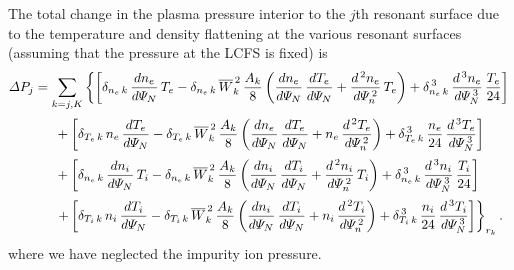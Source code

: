 \documentclass[notitlepage,12pt]{article}
\begin{document}
The total change in the plasma pressure interior to the $j$th resonant surface due to the temperature and
density flattening at the various resonant surfaces (assuming that the pressure at the LCFS is fixed) is
\begin{align}
{\mit\Delta}P_j &=\sum_{k=j,K} 
\left\{\left[\delta_{n_e\,k}\,\frac{dn_e}{d{\mit\Psi}_N}\,T_e- \delta_{n_e\,k}\,\overline{W}_k^{\,2}\,\frac{A_k}{8}\left(\frac{dn_e}{d{\mit\Psi}_N}\,\frac{dT_e}{d{\mit\Psi}_N}+\frac{d^{\,2}n_e}{d{\mit\Psi}_n^{\,2}}\,T_e\right)
+ \delta_{n_e\,k}^{\,3}\,\frac{d^{\,3}n_e}{d{\mit\Psi}_N^{\,3}}\,\frac{T_e}{24}\right]\right.
\nonumber\\[0.5ex]
&\phantom{++}+\left[\delta_{T_e\,k}\,n_e\,\frac{dT_e}{d{\mit\Psi}_N}- \delta_{T_e\,k}\,\overline{W}_k^{\,2}\,\frac{A_k}{8}\left(\frac{dn_e}{d{\mit\Psi}_N}\,\frac{dT_e}{d{\mit\Psi}_N}+
 n_e\,\frac{d^{\,2}T_e}{d{\mit\Psi}_n^{\,2}}\right)
+ \delta_{T_e\,k}^{\,3}\,\frac{n_e}{24}\,\frac{d^{\,3}T_e}{d{\mit\Psi}_N^{\,3}}\right]\nonumber\\[0.5ex]
&\phantom{++}+\left[\delta_{n_e\,k}\,\frac{dn_i}{d{\mit\Psi}_N}\,T_i- \delta_{n_e\,k}\,\overline{W}_k^{\,2}\,\frac{A_k}{8}\left(\frac{dn_i}{d{\mit\Psi}_N}\,\frac{dT_i}{d{\mit\Psi}_N}+\frac{d^{\,2}n_i}{d{\mit\Psi}_n^{\,2}}
\,T_i\right)+ \delta_{n_e\,k}^{\,3}\,\frac{d^{\,3}n_i}{d{\mit\Psi}_N^{\,3}}\,\frac{T_i}{24}\right]
\nonumber\\[0.5ex]
&\phantom{++}\left.+\left[\delta_{T_i\,k}\,n_i\,\frac{dT_i}{d{\mit\Psi}_N}- \delta_{T_i\,k}\,\overline{W}_k^{\,2}\,\frac{A_k}{8}\left(\frac{dn_i}{d{\mit\Psi}_N}\,\frac{dT_i}{d{\mit\Psi}_N}+n_i\,\frac{d^{\,2}T_i}{d{\mit\Psi}_n^{\,2}}\right)
+ \delta_{T_i\,k}^{\,3}\,\frac{n_i}{24}\,\frac{d^{\,3}T_i}{d{\mit\Psi}_N^{\,3}}\right]\right\}_{r_k}.
\end{align}
where
we have neglected the impurity ion pressure. 
\end{document}
